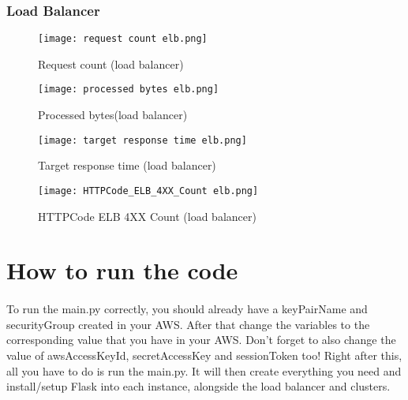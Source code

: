 \documentclass[12pt]{article}
\begin{document}
        \subsubsection{Load Balancer}
            \begin{figure}[htpb]
                \centering
         \texttt{[image: request count elb.png]}
                    \caption{Request count (load balancer)}
                    \label{fig:requescountelb}
                \end{figure}
                \begin{figure}[htpb]
                \centering
                \texttt{[image: processed bytes elb.png]}
                    \caption{Processed bytes(load balancer)}
                    \label{fig:procbyteselb}
                \end{figure}

            \begin{figure}[htpb]
                \centering
           \texttt{[image: target response time elb.png]}
                    \caption{Target response time (load balancer)}
                    \label{fig:targetresponsetimeelb}
                \end{figure}
        \begin{figure}[htpb]
                \centering
           \texttt{[image: HTTPCode\_ELB\_4XX\_Count elb.png]}
                    \caption{HTTPCode ELB 4XX Count (load balancer)}
                    \label{fig:httpelb}
                \end{figure}
           
           


                            
        




	\pagebreak


\section{How to run the code} \label{sec:runcode}
	\paragraph{} To run the main.py correctly, you should already have a keyPairName and securityGroup created in your AWS. After that 
	change the variables to the corresponding value that you have in your AWS. Don't forget to also change the value
	of awsAccessKeyId, secretAccessKey and sessionToken too! Right after this, all you have to do is run the main.py. It will then
	create everything you need and install/setup Flask into each instance, alongside the load balancer and clusters. 
	\bigskip
\end{document}

